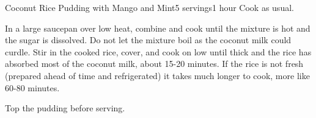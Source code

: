 \documentclass[../Cookbook.tex]{subfiles}
\begin{document}
\begin{recipe}[CoconutRicePudding]{Coconut Rice Pudding with Mango and Mint}{5 servings}{1 hour}
	Cook as usual.

	In a large saucepan over low heat, combine and cook until the mixture is hot and the sugar is dissolved. Do not let the mixture boil as the coconut milk could curdle.
	Stir in the cooked rice, cover, and cook on low until thick and the rice has absorbed most of the coconut milk, about 15-20 minutes.
	If the rice is not fresh (prepared ahead of time and refrigerated) it takes much longer to cook, more like 60-80 minutes.

	Top the pudding before serving.
\end{recipe}
\end{document}
